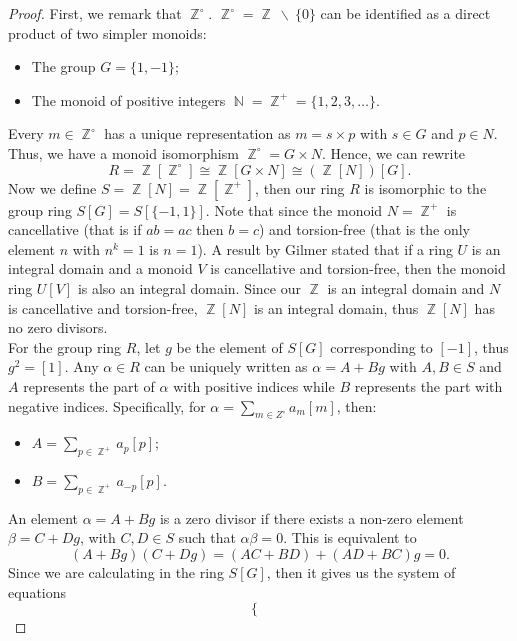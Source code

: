 \documentclass[12t,a4paper]{amsart}
\theoremstyle{definition}
\DeclareMathOperator{\Z}{\mathbb{Z}}
\DeclareMathOperator{\N}{\mathbb{N}}
\numberwithin{equation}{section}
\begin{document}
{\begin{proof}
        First, we remark that $\Z^\circ$. $\Z^\circ = \Z ~\backslash~\{0\}$ can be identified as a direct product of two simpler monoids:
        \begin{itemize}
            \item The group $G = \{1, -1\}$;
            \item The monoid of positive integers $\N = \Z^+ = \{1, 2, 3, \dots\}$.
        \end{itemize}
        Every $m \in \Z^\circ$ has a unique representation as $m = s \times p$ with $s \in G$ and $p \in N$. Thus, we have a monoid isomorphism $\Z^\circ = G \times N$. Hence, we can rewrite \[
            R = \Z[\Z^\circ] \cong \Z[G \times N] \cong (\Z[N])[G].
        \]
        Now we define $S = \Z[N] = \Z[\Z^+]$, then our ring $R$ is isomorphic to the group ring $S[G] = S[\{-1, 1\}]$. Note that since the monoid $N = \Z^+$ is cancellative (that is if $ab = ac$ then $b = c$) and torsion-free (that is the only element $n$ with $n^k = 1$ is $n = 1$). A result by Gilmer \cite{gilmer1984commutative} stated that if a ring $U$ is an integral domain and a monoid $V$ is cancellative and torsion-free, then the monoid ring $U[V]$ is also an integral domain. Since our $\Z$ is an integral domain and $N$ is cancellative and torsion-free, $\Z[N]$ is an integral domain, thus $\Z[N]$ has no zero divisors.
        \\
        For the group ring $R$, let $g$ be the element of $S[G]$ corresponding to $[-1]$, thus $g^2 = [1]$. Any $\alpha \in R$ can be uniquely written as $\alpha = A + Bg$ with $A, B \in S$ and $A$ represents the part of $\alpha$ with positive indices while $B$ represents the part with negative indices. Specifically, for $\alpha = \sum_{m \in Z^\circ}a_m[m]$, then:
        \begin{itemize}
            \item $A = \sum_{p \in \Z^+}a_p[p]$;
            \item $B = \sum_{p \in \Z^+}a_{-p}[p]$.
        \end{itemize}
        An element $\alpha = A + Bg$ is a zero divisor if there exists a non-zero element $\beta = C + Dg$, with $C, D \in S$ such that $\alpha\beta = 0$. This is equivalent to \[
            (A + Bg)(C + Dg) = (AC + BD) + (AD + BC)g = 0.
        \]
        Since we are calculating in the ring $S[G]$, then it gives us the system of equations
        \[
        \begin{cases}

\end{cases}\]
\end{proof}}
\end{document}
